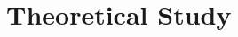 
%         

%         
%         

%         
%         
%         

\part{Theoretical Study}\label{part:theoretical_study}
